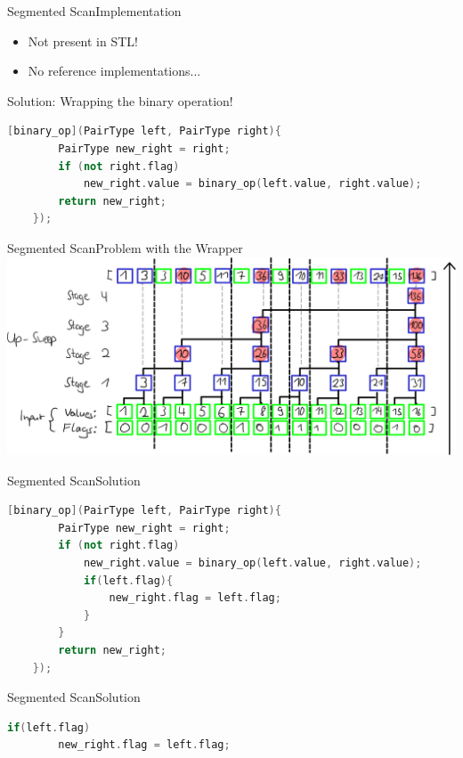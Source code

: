 \begin{frame}[fragile]{Segmented Scan}{Implementation}
    \begin{itemize}
     \item Not present in STL!
     \item No reference implementations...
    \end{itemize}
    \vspace{10pt}
    Solution: Wrapping the binary operation!
    
    
    \begin{lstlisting}[language=C++, frame=single, gobble=4]
    [binary_op](PairType left, PairType right){
        PairType new_right = right;
        if (not right.flag)
            new_right.value = binary_op(left.value, right.value);
        return new_right;
    });
    \end{lstlisting}
\end{frame} 

\begin{frame}{Segmented Scan}{Problem with the Wrapper}
 \centering
 \includegraphics[width=\textwidth]{wiki/ProblemSegmentedUpDown}
\end{frame}

\begin{frame}[fragile]{Segmented Scan}{Solution}
    \begin{lstlisting}[language=C++, frame=single, gobble=4]
    [binary_op](PairType left, PairType right){
        PairType new_right = right;
        if (not right.flag)
            new_right.value = binary_op(left.value, right.value);
            if(left.flag){
                new_right.flag = left.flag;
            }
        }
        return new_right;
    });
    \end{lstlisting}
\end{frame}

\begin{frame}[fragile]{Segmented Scan}{Solution}
    \begin{lstlisting}[language=C++, frame=single, gobble=4]
    if(left.flag)
        new_right.flag = left.flag;
    \end{lstlisting}
\end{frame}

